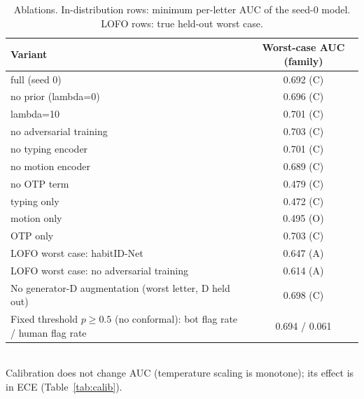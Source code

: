 \begin{table}[t]
\caption{Ablations. In-distribution rows: minimum per-letter AUC of the seed-0 model. LOFO rows: true held-out worst case.}
\label{tab:abl}
\centering
\small
\begin{tabular}{lc}
\toprule
Variant & Worst-case AUC (family) \\
\midrule
full (seed 0) & 0.692 (C) \\
no prior (lambda=0) & 0.696 (C) \\
lambda=10 & 0.701 (C) \\
no adversarial training & 0.703 (C) \\
no typing encoder & 0.701 (C) \\
no motion encoder & 0.689 (C) \\
no OTP term & 0.479 (C) \\
typing only & 0.472 (C) \\
motion only & 0.495 (O) \\
OTP only & 0.703 (C) \\
LOFO worst case: habitID-Net & 0.647 (A) \\
LOFO worst case: no adversarial training & 0.614 (A) \\
No generator-D augmentation (worst letter, D held out) & 0.698 (C) \\
Fixed threshold $p\geq0.5$ (no conformal): bot flag rate / human flag rate & 0.694 / 0.061 \\
\bottomrule
\end{tabular}
\\[2pt]\footnotesize Calibration does not change AUC (temperature scaling is monotone); its effect is in ECE (Table~\ref{tab:calib}).
\end{table}
